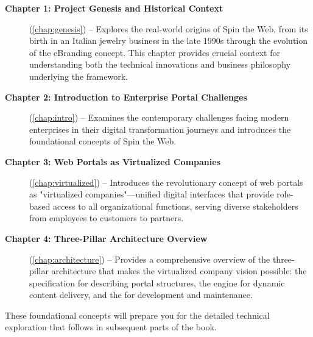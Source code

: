 \begin{description}
\item[\textbf{Chapter 1: Project Genesis and Historical Context}] (\cref{chap:genesis}) -- Explores the real-world origins of Spin the Web, from its birth in an Italian jewelry business in the late 1990s through the evolution of the eBranding concept. This chapter provides crucial context for understanding both the technical innovations and business philosophy underlying the framework.

\item[\textbf{Chapter 2: Introduction to Enterprise Portal Challenges}] (\cref{chap:intro}) -- Examines the contemporary challenges facing modern enterprises in their digital transformation journeys and introduces the foundational concepts of Spin the Web.

\item[\textbf{Chapter 3: Web Portals as Virtualized Companies}] (\cref{chap:virtualized}) -- Introduces the revolutionary concept of web portals as "virtualized companies"—unified digital interfaces that provide role-based access to all organizational functions, serving diverse stakeholders from employees to customers to partners.

\item[\textbf{Chapter 4: Three-Pillar Architecture Overview}] (\cref{chap:architecture}) -- Provides a comprehensive overview of the three-pillar architecture that makes the virtualized company vision possible: the \wbdl{} specification for describing portal structures, the \webspinner{} engine for dynamic content delivery, and the \studio{} for development and maintenance.
\end{description}

These foundational concepts will prepare you for the detailed technical exploration that follows in subsequent parts of the book.

